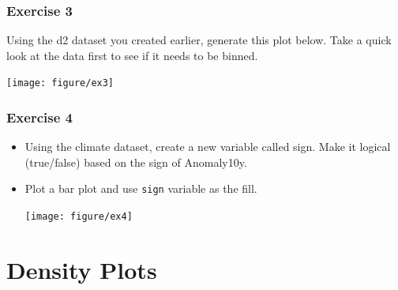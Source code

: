 \documentclass{beamer}\usepackage[]{graphicx}\usepackage[]{color}
\newenvironment{knitrout}{}{} %
\begin{document}

\begin{frame}[fragile]
\frametitle{Exercise 3}
Using the d2 dataset you created earlier, generate this plot below. Take a quick look at the data first to see if it needs to be binned.
\begin{knitrout}\footnotesize
{}\color{fgcolor}

{\centering \texttt{[image: figure/ex3]} 

}



\end{knitrout}

\end{frame}


\begin{frame}[fragile]
\frametitle{Exercise 4}
\begin{itemize}
\item Using the climate dataset, create a new variable called sign. Make it logical (true/false) based on the sign of Anomaly10y.
\item Plot a bar plot and use \texttt{sign} variable as the fill.\\
\begin{knitrout}\footnotesize
{}\color{fgcolor}

{\centering \texttt{[image: figure/ex4]} 

}



\end{knitrout}


\end{itemize}
\end{frame}


\section*{Density Plots}
\frame{\sectionpage}

\end{document}
